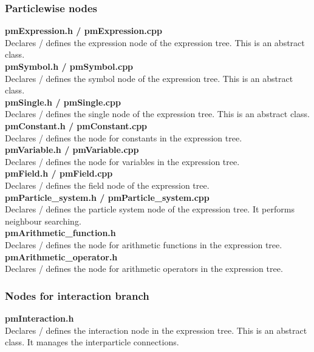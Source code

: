 \documentclass[a4paper,12pt,openany]{book}
\theoremstyle{break}
\begin{document}
\subsubsection{Particlewise nodes}
\textbf{pmExpression.h / pmExpression.cpp} \\
Declares / defines the expression node of the expression tree. This is an abstract class. \\

\textbf{pmSymbol.h / pmSymbol.cpp} \\
Declares / defines the symbol node of the expression tree. This is an abstract class. \\

\textbf{pmSingle.h / pmSingle.cpp} \\
Declares / defines the single node of the expression tree. This is an abstract class. \\

\textbf{pmConstant.h / pmConstant.cpp} \\
Declares / defines the node for constants in the expression tree. \\

\textbf{pmVariable.h / pmVariable.cpp} \\
Declares / defines the node for variables in the expression tree. \\

\textbf{pmField.h / pmField.cpp} \\
Declares / defines the field node of the expression tree. \\

\textbf{pmParticle\_system.h / pmParticle\_system.cpp} \\
Declares / defines the particle system node of the expression tree. It performs neighbour searching. \\

\textbf{pmArithmetic\_function.h} \\
Declares / defines the node for arithmetic functions in the expression tree. \\

\textbf{pmArithmetic\_operator.h} \\
Declares / defines the node for arithmetic operators in the expression tree. \\


\subsubsection{Nodes for interaction branch}
\textbf{pmInteraction.h} \\
Declares / defines the interaction node in the expression tree. This is an abstract class. It manages the interparticle connections. \\
\end{document}
